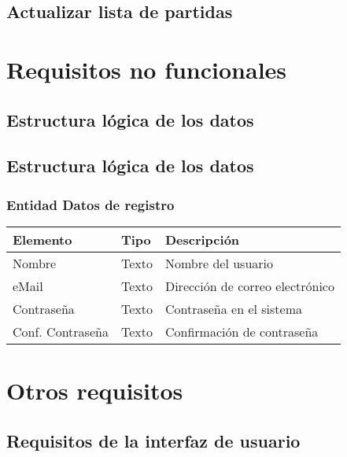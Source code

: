 \subsection{Actualizar lista de partidas}


\section{Requisitos no funcionales}
\subsection{Estructura lógica de los datos}

\subsection{Estructura lógica de los datos}

\subsubsection{Entidad Datos de registro}
\begin{tabularx}{0.9\textwidth}{llX}
\hline
\textbf{Elemento} & \textbf{Tipo} & \textbf{Descripción} \\
\hline
Nombre & Texto & Nombre del usuario \\
eMail & Texto & Dirección de correo electrónico \\
Contraseña & Texto & Contraseña en el sistema \\
Conf. Contraseña & Texto & Confirmación de contraseña \\
\hline
\end{tabularx}



\section{Otros requisitos}
\subsection{Requisitos de la interfaz de usuario}
